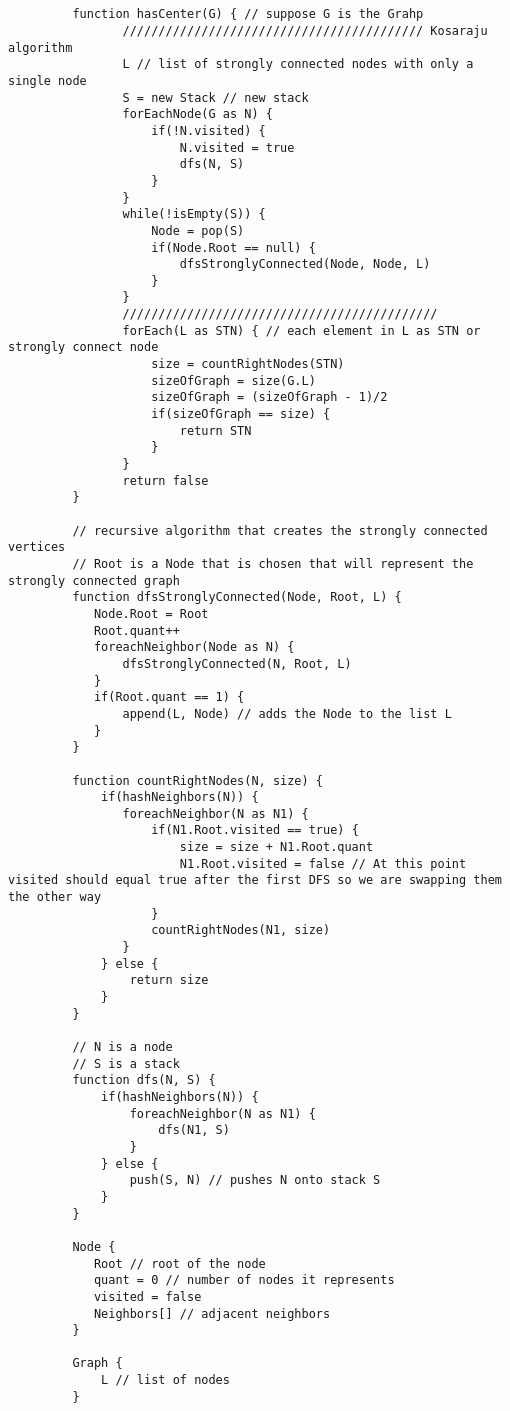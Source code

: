 \documentclass[11pt]{article}
\begin{document}
    \begin{verbatim}
        
         
         function hasCenter(G) { // suppose G is the Grahp
                ////////////////////////////////////////// Kosaraju algorithm
                L // list of strongly connected nodes with only a single node
                S = new Stack // new stack
                forEachNode(G as N) {
                    if(!N.visited) {
                        N.visited = true
                        dfs(N, S)
                    }
                }
                while(!isEmpty(S)) {
                    Node = pop(S)
                    if(Node.Root == null) {
                        dfsStronglyConnected(Node, Node, L)
                    }
                }
                ////////////////////////////////////////////
                forEach(L as STN) { // each element in L as STN or strongly connect node
                    size = countRightNodes(STN)
                    sizeOfGraph = size(G.L)
                    sizeOfGraph = (sizeOfGraph - 1)/2
                    if(sizeOfGraph == size) {
                        return STN
                    }
                }
                return false
         }

         // recursive algorithm that creates the strongly connected vertices
         // Root is a Node that is chosen that will represent the strongly connected graph
         function dfsStronglyConnected(Node, Root, L) { 
            Node.Root = Root
            Root.quant++
            foreachNeighbor(Node as N) {
                dfsStronglyConnected(N, Root, L)
            }
            if(Root.quant == 1) {
                append(L, Node) // adds the Node to the list L
            }
         }
         
         function countRightNodes(N, size) {
             if(hashNeighbors(N)) {
                foreachNeighbor(N as N1) {
                    if(N1.Root.visited == true) {
                        size = size + N1.Root.quant
                        N1.Root.visited = false // At this point visited should equal true after the first DFS so we are swapping them the other way
                    } 
                    countRightNodes(N1, size)
                }
             } else {
                 return size
             }
         }

         // N is a node
         // S is a stack
         function dfs(N, S) {
             if(hashNeighbors(N)) {
                 foreachNeighbor(N as N1) {
                     dfs(N1, S)
                 }
             } else {
                 push(S, N) // pushes N onto stack S
             }
         }  

         Node {
            Root // root of the node
            quant = 0 // number of nodes it represents
            visited = false
            Neighbors[] // adjacent neighbors
         }

         Graph {
             L // list of nodes
         }
 
     \end{verbatim}
\end{document}

